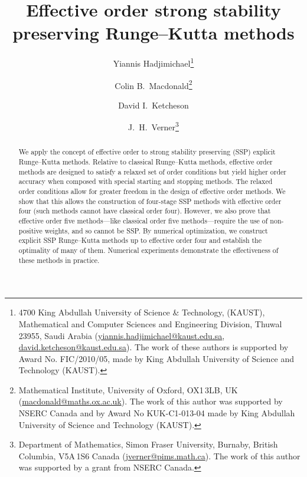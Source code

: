 \documentclass[10pt,a4paper,oneside]{article}
\title{Effective order strong stability preserving Runge--Kutta methods}
\author{
	Yiannis Hadjimichael\footnote{4700 King Abdullah University of Science \& Technology, 
	(KAUST), Mathematical and Computer Sciences and Engineering Division, Thuwal 23955, 
	Saudi Arabia (\url{yiannis.hadjimichael@kaust.edu.sa}, 
	\url{david.ketcheson@kaust.edu.sa}).
	The work of these authors is supported by Award No. FIC/2010/05, made by King 
	Abdullah University of Science and Technology (KAUST).}
    	\and 
    	Colin B.~Macdonald\thanks{Mathematical Institute, University of Oxford, OX1\,3LB, UK 
    	(\url{macdonald@maths.ox.ac.uk}). The work of this author was supported by NSERC 
    	Canada and by Award No KUK-C1-013-04 made by King Abdullah University of Science 
    	and Technology (KAUST).} 
    	\and 
    	David I.~Ketcheson\footnotemark[1]
    	\and 
    	J.~H.~Verner\thanks{Department of Mathematics, Simon Fraser University, Burnaby, 
    	British Columbia, V5A\,1S6 Canada (\url{jverner@pims.math.ca}). The work of this 	
    	author was supported by a grant from NSERC Canada.}
}
\numberwithin{theorem}{section}
\numberwithin{equation}{section}
\numberwithin{table}{section}
\numberwithin{figure}{section}
\begin{document}
	\maketitle
	
	
	\begin{abstract}
  		We apply the concept of effective order to strong stability preserving 
  		(SSP) explicit Runge--Kutta methods.
  		Relative to classical Runge--Kutta methods, effective order methods 
  		are designed to satisfy a relaxed set of order conditions but yield higher 
  		order accuracy  when composed with special starting and stopping methods. 
         The relaxed order conditions allow for greater freedom in the design
         of effective order methods. 
         We show that this allows the construction of four-stage SSP methods with 
         effective order four (such methods cannot have classical order four). 
         However, we also prove that effective order five methods---like classical
         order five methods---require the use of non-positive weights, and so cannot
         be SSP.
         By numerical optimization, we construct explicit SSP Runge--Kutta methods 
         up to effective order four and establish the optimality of many of them.
  		Numerical experiments demonstrate the effectiveness of these methods in 
  		practice.
	\end{abstract}

	
	
	
	
	
	
	


	
\end{document}
